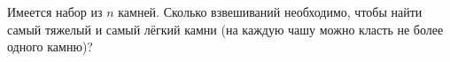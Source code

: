 Имеется набор из $n$ камней. Сколько взвешиваний необходимо, чтобы найти самый тяжелый и самый лёгкий
камни (на каждую чашу можно класть не более одного камню)?
